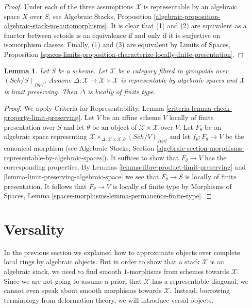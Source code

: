 \documentclass{stacks-project}
\theoremstyle{plain}
\newtheorem{lemma}[subsection]{Lemma}
\theoremstyle{definition}
\theoremstyle{remark}
\numberwithin{equation}{subsection}
\def\Sch{\mathit{Sch}}
\begin{document}
\begin{proof}
Under each of the three assumptions $\mathcal{X}$ is representable
by an algebraic space $X$ over $S$, see Algebraic Stacks, Proposition
\ref{algebraic-proposition-algebraic-stack-no-automorphisms}.
It is clear that (1) and (2) are equivalent as a functor between
setoids is an equivalence if and only if it is surjective on isomorphism
classes. Finally, (1) and (3) are equivalent by
Limits of Spaces, Proposition
\ref{spaces-limits-proposition-characterize-locally-finite-presentation}.
\end{proof}

\begin{lemma}
\label{lemma-diagonal}
Let $S$ be a scheme. Let $\mathcal{X}$ be a category fibred
in groupoids over $(\Sch/S)_{fppf}$. Assume
$\Delta : \mathcal{X} \to \mathcal{X} \times \mathcal{X}$ is
representable by algebraic spaces and $\mathcal{X}$ is limit preserving.
Then $\Delta$ is locally of finite type.
\end{lemma}

\begin{proof}
We apply Criteria for Representability, Lemma
\ref{criteria-lemma-check-property-limit-preserving}.
Let $V$ be an affine scheme $V$ locally of finite presentation over $S$
and let $\theta$ be an object of $\mathcal{X} \times \mathcal{X}$
over $V$. Let $F_\theta$ be an algebraic space representing
$\mathcal{X} \times_{\Delta, \mathcal{X} \times \mathcal{X}, \theta}
(\Sch/V)_{fppf}$ and let $f_\theta : F_\theta \to V$ be the canonical morphism
(see Algebraic Stacks, Section
\ref{algebraic-section-morphisms-representable-by-algebraic-spaces}).
It suffices to show that
$F_\theta \to V$ has the corresponding properties. By
Lemmas \ref{lemma-fibre-product-limit-preserving} and
\ref{lemma-limit-preserving-algebraic-space}
we see that $F_\theta \to S$ is locally of finite presentation.
It follows that $F_\theta \to V$ is locally of finite type
by Morphisms of Spaces, Lemma
\ref{spaces-morphisms-lemma-permanence-finite-type}.
\end{proof}






\section{Versality}
\label{section-versality}

\noindent
In the previous section we explained how to approximate objects over
complete local rings by algebraic objects. But in order to show that
a stack $\mathcal{X}$ is an algebraic stack, we need to find smooth
$1$-morphisms from schemes towards $\mathcal{X}$. Since we are not going
to assume a priori that $\mathcal{X}$ has a representable diagonal, we
cannot even speak about smooth morphisms towards $\mathcal{X}$. Instead,
borrowing terminology from deformation theory, we will introduce versal
objects.
\end{document}
